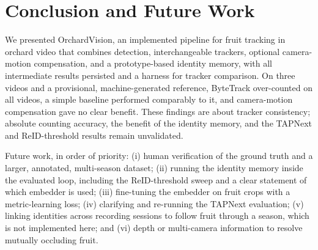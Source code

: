 \documentclass[11pt]{article}
\begin{document}
\section{Conclusion and Future Work}

We presented OrchardVision, an implemented pipeline for fruit tracking in orchard video that combines detection, interchangeable trackers, optional camera-motion compensation, and a prototype-based identity memory, with all intermediate results persisted and a harness for tracker comparison. On three videos and a provisional, machine-generated reference, ByteTrack over-counted on all videos, a simple baseline performed comparably to it, and camera-motion compensation gave no clear benefit. These findings are about tracker consistency; absolute counting accuracy, the benefit of the identity memory, and the TAPNext and ReID-threshold results remain unvalidated.

Future work, in order of priority: (i) human verification of the ground truth and a larger, annotated, multi-season dataset; (ii) running the identity memory inside the evaluated loop, including the ReID-threshold sweep and a clear statement of which embedder is used; (iii) fine-tuning the embedder on fruit crops with a metric-learning loss; (iv) clarifying and re-running the TAPNext evaluation; (v) linking identities across recording sessions to follow fruit through a season, which is not implemented here; and (vi) depth or multi-camera information to resolve mutually occluding fruit.



\end{document}
